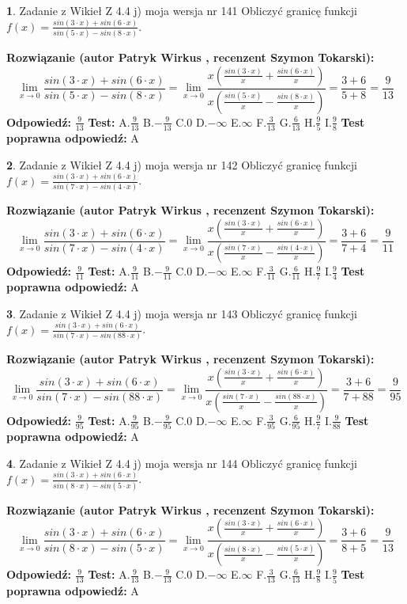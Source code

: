 \documentclass[12pt, a4paper]{article}
\theoremstyle{definition} %
\newtheorem{zad}{}
\newcommand{\zadStart}[1]{\begin{zad}#1\newline}
\newcommand{\zadStop}{\end{zad}}
\newcommand{\rozwStart}[2]{\noindent \textbf{Rozwiązanie (autor #1 , recenzent #2): }\newline}
\newcommand{\rozwStop}{\newline}
\newcommand{\odpStart}{\noindent \textbf{Odpowiedź:}\newline}
\newcommand{\odpStop}{\newline}
\newcommand{\testStart}{\noindent \textbf{Test:}\newline}
\newcommand{\testStop}{\newline}
\newcommand{\kluczStart}{\noindent \textbf{Test poprawna odpowiedź:}\newline}
\newcommand{\kluczStop}{\newline}
\begin{document}
\zadStart{Zadanie z Wikieł Z 4.4 j) moja wersja nr 141}
Obliczyć granicę funkcji $f(x)=\frac{sin(3\cdot x) +sin(6\cdot x)}{sin(5\cdot x) -sin(8\cdot x)}$.
\zadStop
\rozwStart{Patryk Wirkus}{Szymon Tokarski}
$$\lim\limits_{x\to 0}\frac{sin(3\cdot x) +sin(6\cdot x)}{sin(5\cdot x) -sin(8\cdot x)}=\lim\limits_{x\to 0}\frac{x(\frac{sin(3\cdot x)}{x}+\frac{sin(6\cdot x)}{x})}{x(\frac{sin(5\cdot x)}{x}-\frac{sin(8\cdot x)}{x})}=\frac{3+6}{5+8} = \frac{9}{13}$$
\rozwStop
\odpStart
$\frac{9}{13}$
\odpStop
\testStart
A.$\frac{9}{13}$
B.$-\frac{9}{13}$
C.$0$
D.$-\infty$
E.$\infty$
F.$\frac{3}{13}$
G.$\frac{6}{13}$
H.$\frac{9}{5}$
I.$\frac{9}{8}$
\testStop
\kluczStart
A
\kluczStop



\zadStart{Zadanie z Wikieł Z 4.4 j) moja wersja nr 142}
Obliczyć granicę funkcji $f(x)=\frac{sin(3\cdot x) +sin(6\cdot x)}{sin(7\cdot x) -sin(4\cdot x)}$.
\zadStop
\rozwStart{Patryk Wirkus}{Szymon Tokarski}
$$\lim\limits_{x\to 0}\frac{sin(3\cdot x) +sin(6\cdot x)}{sin(7\cdot x) -sin(4\cdot x)}=\lim\limits_{x\to 0}\frac{x(\frac{sin(3\cdot x)}{x}+\frac{sin(6\cdot x)}{x})}{x(\frac{sin(7\cdot x)}{x}-\frac{sin(4\cdot x)}{x})}=\frac{3+6}{7+4} = \frac{9}{11}$$
\rozwStop
\odpStart
$\frac{9}{11}$
\odpStop
\testStart
A.$\frac{9}{11}$
B.$-\frac{9}{11}$
C.$0$
D.$-\infty$
E.$\infty$
F.$\frac{3}{11}$
G.$\frac{6}{11}$
H.$\frac{9}{7}$
I.$\frac{9}{4}$
\testStop
\kluczStart
A
\kluczStop



\zadStart{Zadanie z Wikieł Z 4.4 j) moja wersja nr 143}
Obliczyć granicę funkcji $f(x)=\frac{sin(3\cdot x) +sin(6\cdot x)}{sin(7\cdot x) -sin(88\cdot x)}$.
\zadStop
\rozwStart{Patryk Wirkus}{Szymon Tokarski}
$$\lim\limits_{x\to 0}\frac{sin(3\cdot x) +sin(6\cdot x)}{sin(7\cdot x) -sin(88\cdot x)}=\lim\limits_{x\to 0}\frac{x(\frac{sin(3\cdot x)}{x}+\frac{sin(6\cdot x)}{x})}{x(\frac{sin(7\cdot x)}{x}-\frac{sin(88\cdot x)}{x})}=\frac{3+6}{7+88} = \frac{9}{95}$$
\rozwStop
\odpStart
$\frac{9}{95}$
\odpStop
\testStart
A.$\frac{9}{95}$
B.$-\frac{9}{95}$
C.$0$
D.$-\infty$
E.$\infty$
F.$\frac{3}{95}$
G.$\frac{6}{95}$
H.$\frac{9}{7}$
I.$\frac{9}{88}$
\testStop
\kluczStart
A
\kluczStop



\zadStart{Zadanie z Wikieł Z 4.4 j) moja wersja nr 144}
Obliczyć granicę funkcji $f(x)=\frac{sin(3\cdot x) +sin(6\cdot x)}{sin(8\cdot x) -sin(5\cdot x)}$.
\zadStop
\rozwStart{Patryk Wirkus}{Szymon Tokarski}
$$\lim\limits_{x\to 0}\frac{sin(3\cdot x) +sin(6\cdot x)}{sin(8\cdot x) -sin(5\cdot x)}=\lim\limits_{x\to 0}\frac{x(\frac{sin(3\cdot x)}{x}+\frac{sin(6\cdot x)}{x})}{x(\frac{sin(8\cdot x)}{x}-\frac{sin(5\cdot x)}{x})}=\frac{3+6}{8+5} = \frac{9}{13}$$
\rozwStop
\odpStart
$\frac{9}{13}$
\odpStop
\testStart
A.$\frac{9}{13}$
B.$-\frac{9}{13}$
C.$0$
D.$-\infty$
E.$\infty$
F.$\frac{3}{13}$
G.$\frac{6}{13}$
H.$\frac{9}{8}$
I.$\frac{9}{5}$
\testStop
\kluczStart
A
\kluczStop
\end{document}
